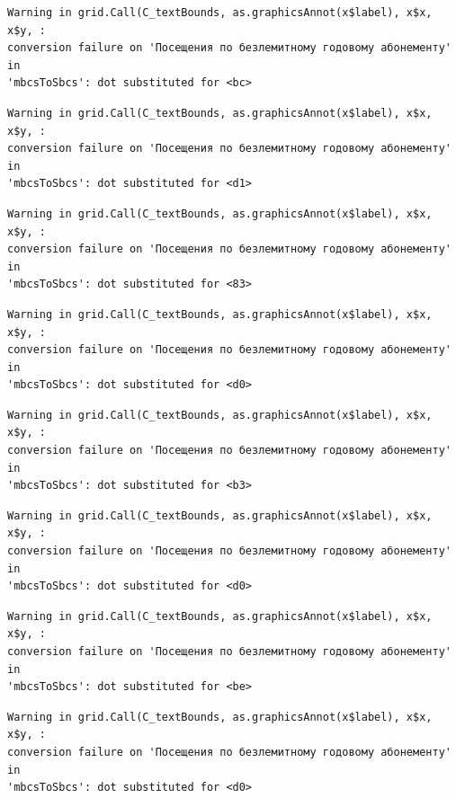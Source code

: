 \documentclass[
  letterpaper,
  DIV=11,
  numbers=noendperiod]{scrartcl}
\begin{document}
\begin{verbatim}
Warning in grid.Call(C_textBounds, as.graphicsAnnot(x$label), x$x, x$y, :
conversion failure on 'Посещения по безлемитному годовому абонементу' in
'mbcsToSbcs': dot substituted for <bc>
\end{verbatim}

\begin{verbatim}
Warning in grid.Call(C_textBounds, as.graphicsAnnot(x$label), x$x, x$y, :
conversion failure on 'Посещения по безлемитному годовому абонементу' in
'mbcsToSbcs': dot substituted for <d1>
\end{verbatim}

\begin{verbatim}
Warning in grid.Call(C_textBounds, as.graphicsAnnot(x$label), x$x, x$y, :
conversion failure on 'Посещения по безлемитному годовому абонементу' in
'mbcsToSbcs': dot substituted for <83>
\end{verbatim}

\begin{verbatim}
Warning in grid.Call(C_textBounds, as.graphicsAnnot(x$label), x$x, x$y, :
conversion failure on 'Посещения по безлемитному годовому абонементу' in
'mbcsToSbcs': dot substituted for <d0>
\end{verbatim}

\begin{verbatim}
Warning in grid.Call(C_textBounds, as.graphicsAnnot(x$label), x$x, x$y, :
conversion failure on 'Посещения по безлемитному годовому абонементу' in
'mbcsToSbcs': dot substituted for <b3>
\end{verbatim}

\begin{verbatim}
Warning in grid.Call(C_textBounds, as.graphicsAnnot(x$label), x$x, x$y, :
conversion failure on 'Посещения по безлемитному годовому абонементу' in
'mbcsToSbcs': dot substituted for <d0>
\end{verbatim}

\begin{verbatim}
Warning in grid.Call(C_textBounds, as.graphicsAnnot(x$label), x$x, x$y, :
conversion failure on 'Посещения по безлемитному годовому абонементу' in
'mbcsToSbcs': dot substituted for <be>
\end{verbatim}

\begin{verbatim}
Warning in grid.Call(C_textBounds, as.graphicsAnnot(x$label), x$x, x$y, :
conversion failure on 'Посещения по безлемитному годовому абонементу' in
'mbcsToSbcs': dot substituted for <d0>
\end{verbatim}
\end{document}
